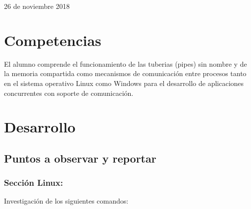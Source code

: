 \documentclass[12pt]{article}
\begin{document}
\begin{titlepage}
\begin{center}
				\vfill
				
				{\large 26 de noviembre 2018}
			\end{center}
		\end{titlepage}
	
	\tableofcontents
	\newpage
	
	

	\section{Competencias}
	El alumno comprende el funcionamiento de las tuberias (pipes) sin nombre y de la memoria compartida como mecanismos de comunicación entre procesos tanto en el sistema operativo Linux como Windows para el desarrollo de aplicaciones concurrentes con soporte de comunicación.


  \section{Desarrollo}

  
    \subsection{Puntos a observar y reportar}
              
                
      \subsubsection{Sección Linux:}
      Investigación de los siguientes comandos:
\end{document}
